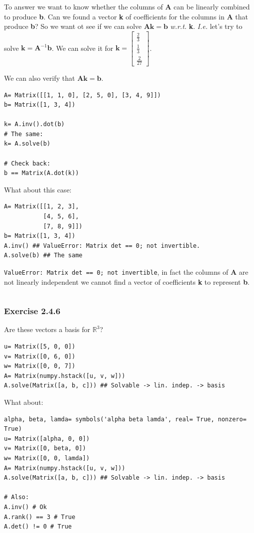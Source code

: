 To answer we want to know whether the columns of \textbf{A} can be linearly combined
to produce \textbf{b}. Can we found a vector \textbf{k} of coefficients for the
columns in \textbf{A} that produce \textbf{b}?
So we want ot see if we can solve $\mathbf{Ak} = \mathbf{b}$ \emph{w.r.t.} \textbf{k}.
\emph{I.e.} let's try to solve $\mathbf{k}= \mathbf{A}^{-1}\mathbf{b}$. We can solve it
for $\mathbf{k} = \left[\begin{matrix}\frac{2}{3}\\\frac{1}{3}\\\frac{2}{27}\end{matrix}\right]$.

We can also verify that $\mathbf{Ak} = \mathbf{b}$.

\begin{verbatim}
A= Matrix([[1, 1, 0], [2, 5, 0], [3, 4, 9]])
b= Matrix([1, 3, 4])

k= A.inv().dot(b)
# The same:
k= A.solve(b)

# Check back:
b == Matrix(A.dot(k))
\end{verbatim}

What about this case:

\begin{verbatim}
A= Matrix([[1, 2, 3],
           [4, 5, 6],
           [7, 8, 9]])
b= Matrix([1, 3, 4])
A.inv() ## ValueError: Matrix det == 0; not invertible.
A.solve(b) ## The same
\end{verbatim}

\texttt{ValueError: Matrix det == 0; not invertible}, in fact the columns of \textbf{A}
are not linearly independent we cannot find a vector of coefficients \textbf{k} 
to represent \textbf{b}.

\begin{verbatim}
\end{verbatim}

\subsubsection{Exercise 2.4.6}

Are these vectors a basis for $\mathbb{R}^3$?

\begin{verbatim}
u= Matrix([5, 0, 0])
v= Matrix([0, 6, 0])
w= Matrix([0, 0, 7])
A= Matrix(numpy.hstack([u, v, w]))
A.solve(Matrix([a, b, c])) ## Solvable -> lin. indep. -> basis
\end{verbatim}

What about:

\begin{verbatim}
alpha, beta, lamda= symbols('alpha beta lamda', real= True, nonzero= True)
u= Matrix([alpha, 0, 0])
v= Matrix([0, beta, 0])
w= Matrix([0, 0, lamda])
A= Matrix(numpy.hstack([u, v, w]))
A.solve(Matrix([a, b, c])) ## Solvable -> lin. indep. -> basis

# Also:
A.inv() # Ok
A.rank() == 3 # True
A.det() != 0 # True
\end{verbatim}
